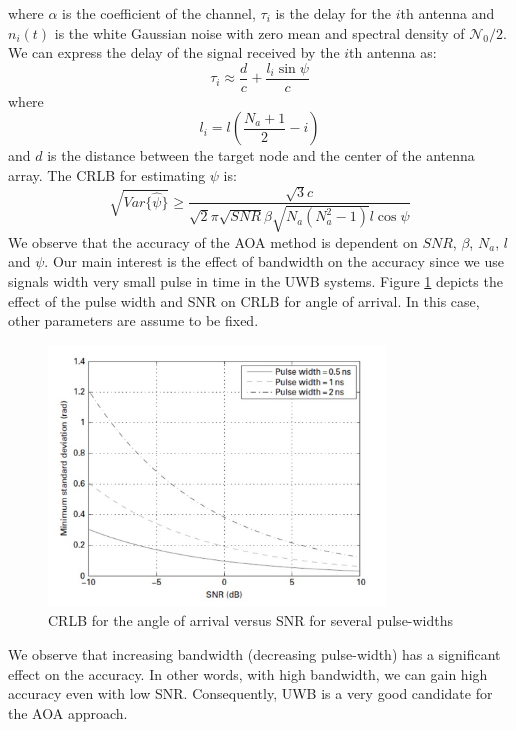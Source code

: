 \documentclass[../../main.tex]{subfiles}
\begin{document}
where $\alpha$ is the coefficient of the channel, $\tau_i$ is the delay for the $i$th antenna and $n_i(t)$ is the white Gaussian noise with zero mean and spectral density of $\mathcal{N}_0/2$. We can express the delay of the signal received by the $i$th antenna as:
\begin{equation}
    \tau_i \approx \frac{d}{c} + \frac{l_i \sin{\psi}}{c}
\end{equation}
where
\begin{equation}
    l_i = l \left( \frac{N_a+1}{2} - i \right)
\end{equation}
and $d$ is the distance between the target node and the center of the antenna array. The CRLB for estimating $\psi$ is:
\begin{equation}
    \sqrt{Var\{\hat{\psi}\}} \geq \frac{\sqrt{3}c}{\sqrt{2}\pi\sqrt{SNR}\beta\sqrt{N_a(N_a^2-1)}l\cos{\psi}}
\end{equation}
We observe that the accuracy of the AOA method is dependent on $SNR$, $\beta$, $N_a$, $l$ and $\psi$. Our main interest is the effect of bandwidth on the accuracy since we use signals width very small pulse in time in the UWB systems. Figure \ref{fig:aoa_crlb_ for_angle_of_arrival_versus_snr} depicts the effect of the pulse width and SNR on CRLB for angle of arrival. In this case, other parameters are assume to be fixed.

\begin{figure}[!htbp]
    \centering
    \includegraphics[width=0.8\textwidth]{aoa_crlb_for_angle_of_arrival_versus_snr}
    \caption{CRLB for the angle of arrival versus SNR for several pulse-widths}
    \label{fig:aoa_crlb_ for_angle_of_arrival_versus_snr}
\end{figure}
We observe that increasing bandwidth (decreasing pulse-width) has a significant effect on the accuracy. In other words, with high bandwidth, we can gain high accuracy even with low SNR. Consequently, UWB is a very good candidate for the AOA approach.
\end{document}
